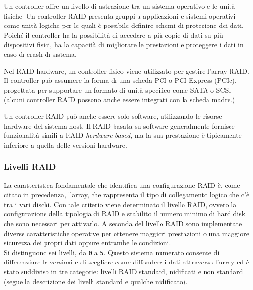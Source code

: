 Un controller offre un livello di astrazione tra un sistema operativo e le unit\`{a} fisiche. Un controller RAID presenta gruppi a applicazioni e sistemi operativi come unit\`{a} logiche per le quali \`{e} possibile definire schemi di protezione dei dati. Poich\'{e} il controller ha la possibilit\`{a} di accedere a pi\`{u} copie di dati su pi\`{u} dispositivi fisici, ha la capacit\`{a} di migliorare le prestazioni e proteggere i dati in caso di crash di sistema.

Nel RAID hardware, un controller fisico viene utilizzato per gestire l'array RAID. Il controller pu\`{o} assumere la forma di una scheda PCI o PCI Express (PCIe), progettata per supportare un formato di unit\`{a} specifico come SATA o SCSI (alcuni controller RAID possono anche essere integrati con la scheda madre.) 

Un controller RAID pu\`{o} anche essere solo software, utilizzando le risorse hardware del sistema host. Il RAID basata su software generalmente fornisce funzionalit\`{a} simili a RAID \textit{hardware-based}, ma la sua prestazione \`{e} tipicamente inferiore a quella delle versioni hardware.\cite{etichetta12}

\item
\subsubsection{Livelli RAID}
La caratteristica fondamentale che identifica una configurazione RAID \`{e}, come citato in precedenza, l'array, che rappresenta il tipo di collegamento logico che c'\`{e} tra i vari dischi.
Con tale criterio viene determinato il livello RAID, ovvero la configurazione della tipologia di RAID  e stabilito il numero minimo di hard disk che sono necessari per attivarlo. A seconda del livello RAID sono implementate diverse caratteristiche operative per ottenere maggiori prestazioni o una maggiore sicurezza dei propri dati oppure entrambe le condizioni.\\
Si distinguono sei livelli, da \verb"0" a \verb"5".
Questo sistema numerato consente di differenziare le versioni e di scegliere come diffondere i dati attraverso l'array ed \`{e} stato suddiviso in tre categorie: livelli RAID standard, nidificati e non standard\cite{etichetta9} (segue la descrizione dei livelli standard e qualche nidificato).

